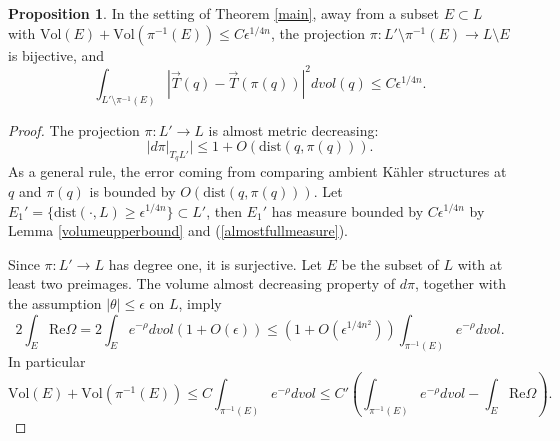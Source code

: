 \documentclass[a4paper]{article}
\theoremstyle{definition}
\newtheorem{prop}[thm]{Proposition}
\begin{document}
\begin{prop}\label{almostgraphical}
In the setting of Theorem \ref{main},  away from a subset $E\subset L$ with $\text{Vol}(E)+ \text{Vol}(\pi^{-1}(E))\leq C\epsilon^{1/4n}$, the projection $\pi:L'\setminus \pi^{-1}(E)\to L\setminus E$ is bijective, and 
\[
\int_{ L'\setminus \pi^{-1}(E) } |\vec{T}(q)- \vec{T}(\pi(q))|^2 dvol(q) \leq C\epsilon^{1/4n}.
\]
\end{prop}





\begin{proof}
The projection $\pi: L'\to L$ is almost metric decreasing: 
\[
|d\pi|_{T_q L'} |\leq 1+ O(\text{dist}(q, \pi(q))).
\]
As a general rule, the error coming from comparing ambient K\"ahler structures at $q$ and $\pi(q)$ is bounded by $O(\text{dist}(q,\pi(q)))$. Let $E_1'= \{ \text{dist}(\cdot, L)\geq \epsilon^{1/4n}   \}\subset L'$, then $E_1'$ has measure bounded by $C\epsilon^{1/4n}$ by Lemma \ref{volumeupperbound} and (\ref{almostfullmeasure}).


Since $\pi:L'\to L$ has degree one, it is surjective.
Let $E$ be the subset of $L $ with at least two preimages. The volume almost decreasing property of $d\pi$, together with the assumption $|\theta|\leq \epsilon$ on $L$, imply
\[
2\int_{E}\text{Re}\Omega=
2\int_{E}  e^{-\rho}dvol (1+ O(\epsilon)) \leq  (1+ O(\epsilon^{1/4n^2})) \int_{ \pi^{-1} (E)} e^{-\rho}dvol.
\]
In particular
\begin{equation}\label{doublecovervol}
\text{Vol}(E)+ \text{Vol}(\pi^{-1}(E))\leq 
C\int_{ \pi^{-1} (E)} e^{-\rho}dvol\leq C' ( \int_{ \pi^{-1} (E)} e^{-\rho}dvol- \int_E  \text{Re}\Omega).
\end{equation}







\end{proof}
\end{document}
